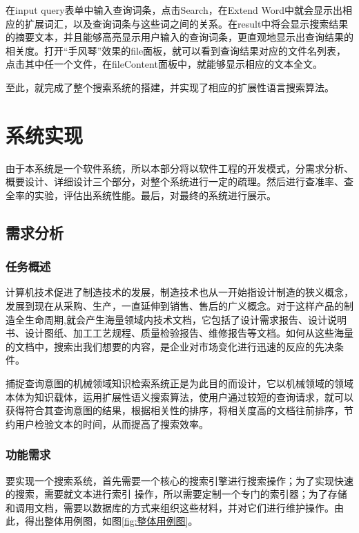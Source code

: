 \documentclass[12pt,a4paper]{article}
\begin{document}
	在input query表单中输入查询词条，点击Search，在Extend Word中就会显示出相应的扩展词汇，以及查询词条与这些词之间的关系。在result中将会显示搜索结果的摘要文本，并且能够高亮显示用户输入的查询词条，更直观地显示出查询结果的相关度。打开“手风琴”效果的file面板，就可以看到查询结果对应的文件名列表，点击其中任一个文件，在fileContent面板中，就能够显示相应的文本全文。
	
	至此，就完成了整个搜索系统的搭建，并实现了相应的扩展性语言搜索算法。
	
\section{系统实现}
	由于本系统是一个软件系统，所以本部分将以软件工程的开发模式，分需求分析、概要设计、详细设计三个部分，对整个系统进行一定的疏理。然后进行查准率、查全率的实验，评估出系统性能。最后，对最终的系统进行展示。
	\subsection{需求分析}
		\subsubsection{任务概述}
	计算机技术促进了制造技术的发展，制造技术也从一开始指设计制造的狭义概念，发展到现在从采购、生产，一直延伸到销售、售后的广义概念。对于这样产品的制造全生命周期,就会产生海量领域内技术文档，它包括了设计需求报告、设计说明书、设计图纸、加工工艺规程、质量检验报告、维修报告等文档。如何从这些海量的文档中，搜索出我们想要的内容，是企业对市场变化进行迅速的反应的先决条件。
	
	捕捉查询意图的机械领域知识检索系统正是为此目的而设计，它以机械领域的领域本体为知识载体，运用扩展性语义搜索算法，使用户通过较短的查询请求，就可以获得符合其查询意图的结果，根据相关性的排序，将相关度高的文档往前排序，节约用户检验文本的时间，从而提高了搜索效率。
   
		\subsubsection{功能需求}
	要实现一个搜索系统，首先需要一个核心的搜索引擎进行搜索操作；为了实现快速的搜索，需要就文本进行索引	操作，所以需要定制一个专门的索引器；为了存储和调用文档，需要以数据库的方式来组织这些材料，并对它们进行维护操作。由此，得出整体用例图，如图\ref{fig:整体用例图}。
	
\end{document}
